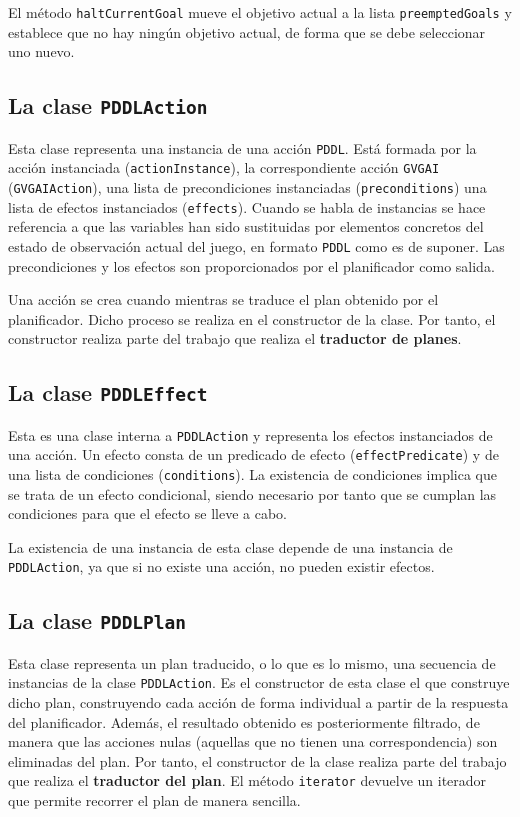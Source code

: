 El método \texttt{haltCurrentGoal} mueve el objetivo actual a la lista \texttt{preemptedGoals}
y establece que no hay ningún objetivo actual, de forma que se debe seleccionar uno nuevo.

\subsection{La clase \texttt{PDDLAction}}

Esta clase representa una instancia de una acción \texttt{PDDL}. Está formada por la acción instanciada
(\texttt{actionInstance}), la correspondiente acción \texttt{GVGAI} (\texttt{GVGAIAction}), una lista
de precondiciones instanciadas (\texttt{preconditions}) una lista de efectos instanciados (\texttt{effects}).
Cuando se habla de instancias se hace referencia a que las variables han sido sustituidas por elementos
concretos del estado de observación actual del juego, en formato \texttt{PDDL} como es de suponer.
Las precondiciones y los efectos son proporcionados por el planificador como salida.

Una acción se crea cuando mientras se traduce el plan obtenido por el planificador. Dicho proceso
se realiza en el constructor de la clase. Por tanto, el constructor realiza parte del trabajo que realiza
el \textbf{traductor de planes}.

\subsection{La clase \texttt{PDDLEffect}}

Esta es una clase interna a \texttt{PDDLAction} y representa los efectos instanciados de una acción.
Un efecto consta de un predicado de efecto (\texttt{effectPredicate}) y de una lista de condiciones
(\texttt{conditions}). La existencia de condiciones implica que se trata de un efecto condicional,
siendo necesario por tanto que se cumplan las condiciones para que el efecto se lleve a cabo.

La existencia de una instancia de esta clase depende de una instancia de \texttt{PDDLAction}, ya
que si no existe una acción, no pueden existir efectos.

\subsection{La clase \texttt{PDDLPlan}}

Esta clase representa un plan traducido, o lo que es lo mismo, una secuencia de instancias de la
clase \texttt{PDDLAction}. Es el constructor de esta clase el que construye dicho plan, construyendo
cada acción de forma individual a partir de la respuesta del planificador. Además, el resultado obtenido
es posteriormente filtrado, de manera que las acciones nulas (aquellas que no tienen una correspondencia)
son eliminadas del plan. Por tanto, el constructor de la clase realiza parte del trabajo que realiza el
\textbf{traductor del plan}. El método \texttt{iterator} devuelve un iterador que permite recorrer el plan
de manera sencilla.

